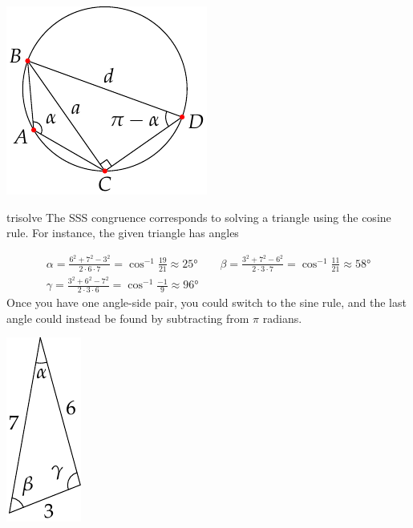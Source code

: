 \begin{minipage}[t]{0.25\linewidth}
\includegraphics[scale=0.95]{angles-sinerule2}\\[-20pt]\hfill\qedsymbol
\end{minipage}


\begin{examples}{}{trisolve}
\exstart The SSS congruence corresponds to solving a triangle using the cosine rule. For instance, the given triangle has angles
\begin{enumerate}\setcounter{enumi}{1}
\begin{minipage}[t]{0.86\linewidth}\vspace{-13pt}
  \item[]\begin{gather*}
		\alpha=\frac{6^2+7^2-3^2}{2\cdot 6\cdot 7}=\cos^{-1}\frac{19}{21}\approx\ang{25}\qquad
		\beta=\frac{3^2+7^2-6^2}{2\cdot 3\cdot 7}=\cos^{-1}\frac{11}{21}\approx\ang{58}\\[5pt]
		\gamma=\frac{3^2+6^2-7^2}{2\cdot 3\cdot 6}=\cos^{-1}\frac{-1}{9}\approx\ang{96}
	\end{gather*}
	Once you have one angle-side pair, you could switch to the sine rule, and the last angle could instead be found by subtracting from $\pi$ radians.
\end{minipage}\hfill\begin{minipage}[t]{0.13\linewidth}\vspace{-24pt}
	\flushright\includegraphics[scale=0.95]{angles-ssssolve}

\end{minipage}
\end{enumerate}
\end{examples}
